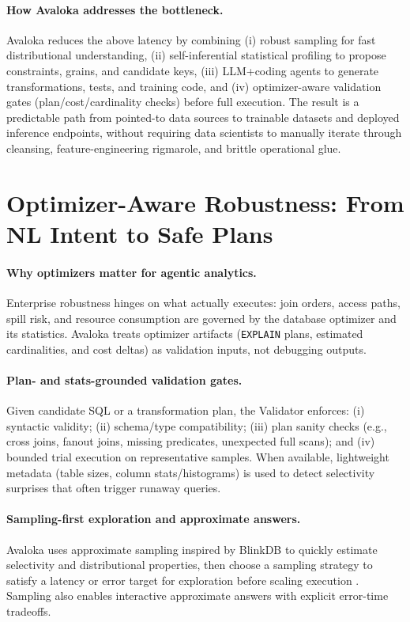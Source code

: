\documentclass{article} %
\begin{document}
\paragraph{How Avaloka addresses the bottleneck.}
Avaloka reduces the above latency by combining (i) robust sampling for fast distributional understanding,
(ii) self-inferential statistical profiling to propose constraints, grains, and candidate keys,
(iii) LLM+coding agents to generate transformations, tests, and training code, and (iv) optimizer-aware
validation gates (plan/cost/cardinality checks) before full execution. The result is a predictable path
from pointed-to data sources to trainable datasets and deployed inference endpoints, without requiring
data scientists to manually iterate through cleansing, feature-engineering rigmarole, and brittle
operational glue.

\section{Optimizer-Aware Robustness: From NL Intent to Safe Plans}
\label{sec:optimizer}
\paragraph{Why optimizers matter for agentic analytics.}
Enterprise robustness hinges on what actually executes: join orders, access paths, spill risk, and resource
consumption are governed by the database optimizer and its statistics. Avaloka treats optimizer artifacts
(\texttt{EXPLAIN} plans, estimated cardinalities, and cost deltas) as validation inputs, not debugging outputs.

\paragraph{Plan- and stats-grounded validation gates.}
Given candidate SQL or a transformation plan, the Validator enforces:
(i) syntactic validity; (ii) schema/type compatibility; (iii) plan sanity checks (e.g., cross joins, fanout
joins, missing predicates, unexpected full scans); and (iv) bounded trial execution on representative samples.
When available, lightweight metadata (table sizes, column stats/histograms) is used to detect selectivity
surprises that often trigger runaway queries.

\paragraph{Sampling-first exploration and approximate answers.}
Avaloka uses approximate sampling inspired by BlinkDB to quickly estimate selectivity and distributional
properties, then choose a sampling strategy to satisfy a latency or error target for exploration before
scaling execution \citep{blinkdb_dbdb}. Sampling also enables interactive approximate answers with explicit
error-time tradeoffs.
\end{document}
